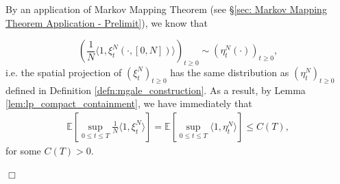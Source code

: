 \documentclass[12pt]{article}
\newenvironment {proof}{{\noindent\bf Proof }}{\hfill $\Box$ \medskip}
\newcommand{\IE}{\mathbb E}
\begin{document}
\begin{proof}
By an application of Markov Mapping Theorem (see \S \ref{sec: Markov Mapping Theorem Application - Prelimit}), we know that 

$$\left(\frac{1}{N}\langle 1, \xi^{N}_t(\cdot , [0, N]) \rangle\right)_{t \geq 0} \sim (\eta^N_t(\cdot ))_{t \geq 0},$$
i.e. the spatial projection of $(\xi^{N}_t)_{t \geq 0}$ has the same distribution as $(\eta^N_t)_{t \geq 0}$ defined in Definition \ref{defn:mgale_construction}. 
As a result, by Lemma \ref{lem:lp_compact_containment},
we have immediately that 
\begin{align}
        \IE\left[
            \sup_{0 \le t \le T}
            \frac{1}{N}\langle 1, \xi^{N}_t \rangle
        \right]
        = \IE\left[
            \sup_{0 \le t \le T}
            \langle 1, \eta^{N}_t \rangle
        \right]
        \le C(T) ,
    \end{align}
for some $C(T)>0$.


\end{proof}
\end{document}
